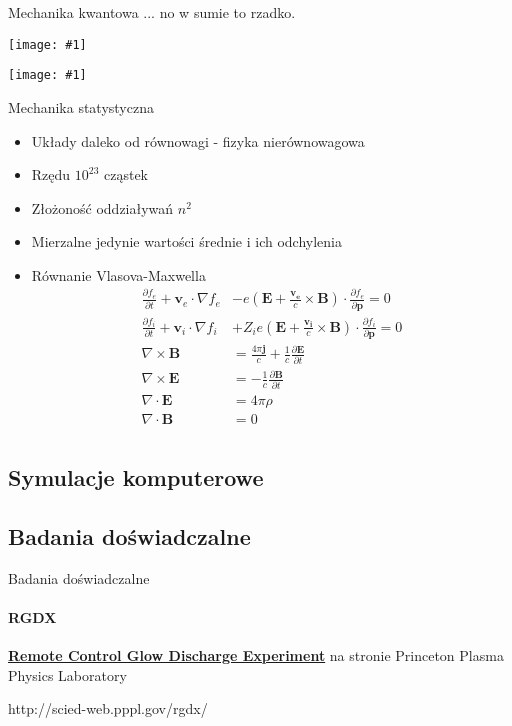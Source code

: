 \documentclass{beamer}
\newcommand {\framedgraphic}[1] {
        \begin{center}
            \texttt{[image: \#1]}
        \end{center}
}
\begin{document}
\begin{frame}[t]{Mechanika kwantowa}
  ... no w sumie to rzadko.
  \framedgraphic{img/google_plasma.png}
  \pause
  \framedgraphic{img/google_qplasma.png}
\end{frame}

\begin{frame}[t]{Mechanika statystyczna}
  \begin{itemize}[<+->]
    \item Układy daleko od równowagi - fizyka nierównowagowa
    \item Rzędu $10^{23}$ cząstek
    \item Złożoność oddziaływań $n^2$
    \item Mierzalne jedynie wartości średnie i ich odchylenia
    \item Równanie Vlasova-Maxwella
    \begin{align}
      \frac{\partial f_e}{\partial t} + \mathbf {v}_e\cdot\nabla f_e &- e\left(\mathbf {E}+\frac{\mathbf {v_e}}{c}\times\mathbf {B}\right)\cdot\frac{\partial f_e}{\partial\mathbf {p}} = 0 \\
      \frac{\partial f_i}{\partial t} + \mathbf {v}_i\cdot\nabla f_i &+ Z_i e\left(\mathbf {E}+\frac{\mathbf {v_i}}{c}\times\mathbf {B}\right)\cdot\frac{\partial f_i}{\partial\mathbf {p}} = 0 \\
      \nabla\times\mathbf {B} &=\frac{4\pi\mathbf {j}}{c}+\frac{1}{c}\frac{\partial\mathbf {E}}{\partial t} \\
      \nabla\times\mathbf {E} &=-\frac{1}{c}\frac{\partial\mathbf {B}}{\partial t} \\
      \nabla\cdot\mathbf {E}  &=4\pi\rho \\
      \nabla\cdot\mathbf {B}  &=0 \\
    \end{align}
  \end{itemize}
\end{frame}

\subsection{Symulacje komputerowe}

\subsection{Badania doświadczalne}
\begin{frame}[t]{Badania doświadczalne}
  \framesubtitle{RGDX}
  \href{http://scied-web.pppl.gov/rgdx/}{\textbf{Remote Control Glow Discharge Experiment}}
  na stronie Princeton Plasma Physics Laboratory

  http://scied-web.pppl.gov/rgdx/
\end{frame}
\end{document}
